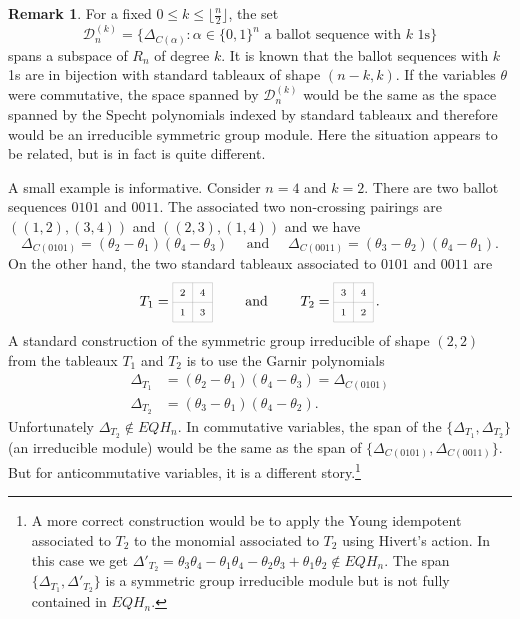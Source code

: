 \documentclass[11pt,oneside]{amsart}
\theoremstyle{definition}
\newtheorem{remark}[theorem]{Remark}
\numberwithin{equation}{section}
\begin{document}
\begin{remark} For a fixed $0\le k\le \lfloor \frac{n}{2}\rfloor$, the set
$${\mathcal D}^{(k)}_n =\big\{ \Delta_{C(\alpha)}:  \alpha \in \{0, 1\}^n \text{ a ballot sequence with $k$  1s}\big\}$$
spans a subspace of $R_n$ of degree $k$.
It is known that the ballot sequences with $k$ 1s are in bijection with standard tableaux of shape $(n-k,k)$.
If  the variables $\theta$  were  commutative, the space spanned by ${\mathcal D}^{(k)}_n$ would be the same as the space spanned
by the Specht polynomials indexed by standard tableaux and therefore
would be an irreducible symmetric group module.
Here the situation appears to be related, but is in fact is quite different.

A small example is informative.
Consider $n=4$ and $k=2$.
There are two ballot sequences $0101$ and $0011$.
The associated two non-crossing pairings are
$((1,2),(3,4))$ and $((2,3),(1,4))$ and we have
$$\Delta_{C(0101)}=  (\theta_{2}-\theta_{1})(\theta_{4}-\theta_{3}) \quad\text{ and }\quad \Delta_{C(0011)}=(\theta_{3}-\theta_{2})(\theta_{4}-\theta_{1}).
$$
On the other hand, the two standard tableaux associated to $0101$ and $0011$ are
$$
T_1=\begin{tikzpicture}[scale=0.5,baseline=12pt]
	\draw[help lines] (0,0) grid (2,2);
	\node at (.5,.5){$\scriptstyle 1$};
	\node at (.5,1.5){$\scriptstyle 2$};
	\node at (1.5,.5){$\scriptstyle 3$};
	\node at (1.5,1.5){$\scriptstyle 4$};
\end{tikzpicture}
\qquad\text{ and }\qquad
T_2=\begin{tikzpicture}[scale=0.5,baseline=12pt]
	\draw[help lines] (0,0) grid (2,2);
	\node at (.5,.5){$\scriptstyle 1$};
	\node at (.5,1.5){$\scriptstyle 3$};
	\node at (1.5,.5){$\scriptstyle 2$};
	\node at (1.5,1.5){$\scriptstyle 4$};
\end{tikzpicture}\,.
$$
A standard construction of the symmetric group irreducible of shape  $(2,2)$ from the
tableaux $T_1$ and $T_2$ is to use the Garnir polynomials
\begin{align*}
  \Delta_{T_1} &=  (\theta_{2}-\theta_{1})(\theta_{4}-\theta_{3}) =\Delta_{C(0101)}\\
  \Delta_{T_2} &= (\theta_{3}-\theta_{1})(\theta_{4}-\theta_{2}).
\end{align*}
Unfortunately $ \Delta_{T_2}\notin EQH_n$.  In commutative variables, the  span of the $\{\Delta_{T_1},\Delta_{T_2}\}$ (an irreducible module) would be the same as
 the span of $\{\Delta_{C(0101)},\Delta_{C(0011)}\}$. But  for anticommutative variables, it is a  different story.\footnote{A more correct construction would be to apply the Young idempotent associated to $T_2$ to the monomial associated to $T_2$ using Hivert's action.
In this case  we get $\Delta'_{T_2}=  \theta_3\theta_4 -  \theta_1\theta_4 -  \theta_2\theta_3 +  \theta_1\theta_2 \notin EQH_n$. The span $\{\Delta_{T_1},\Delta'_{T_2}\}$ is a symmetric group irreducible module but is not fully contained in $EQH_n$.}
\end{remark}
\end{document}
